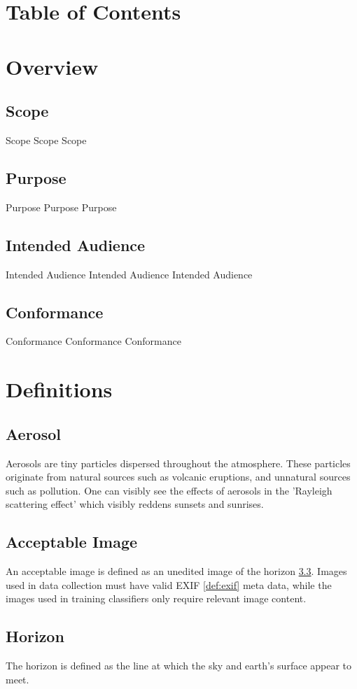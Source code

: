 \documentclass[onecolumn, draftclsnofoot,10pt, compsoc]{IEEEtran}
\begin{document}
\section{Table of Contents}
\tableofcontents
\clearpage

\begin{singlespace}
\section{Overview}
	\subsection{Scope}
		Scope Scope Scope
	\subsection{Purpose}
		Purpose Purpose Purpose
	\subsection{Intended Audience}
		Intended Audience Intended Audience Intended Audience
	\subsection{Conformance}
		Conformance Conformance Conformance
\section{Definitions}
	\subsection{Aerosol}\label{def:aerosol}
		Aerosols are tiny particles dispersed throughout the atmosphere.
		These particles originate from natural sources such as volcanic eruptions, and unnatural sources such as pollution. 
		One can visibly see the effects of aerosols in the 'Rayleigh scattering effect' \cite{allen_2015} which visibly reddens sunsets and sunrises.
	\subsection{Acceptable Image}\label{def:accImg}
		An acceptable image is defined as an unedited image of the horizon \ref{def:horizon}.
		Images used in data collection must have valid EXIF \ref{def:exif} meta data, while the images used in training classifiers only require relevant image content.
	\subsection{Horizon}\label{def:horizon}
		The horizon is defined as the line at which the sky and earth's surface appear to meet.

\end{singlespace}
\end{document}
